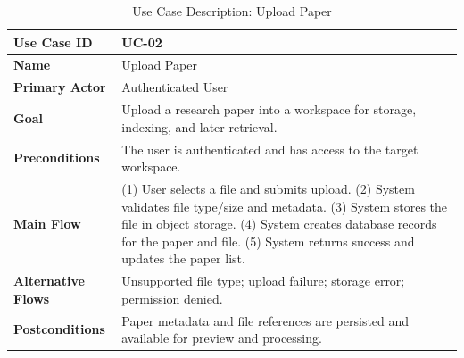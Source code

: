 \begin{table}[H]
    \centering
    \small
    \begin{tabularx}{\textwidth}{|l|X|}
        \hline
        \textbf{Use Case ID}       & UC-02                                                                                                                                                                                                                                                          \\
        \hline
        \textbf{Name}              & Upload Paper                                                                                                                                                                                                                                                   \\
        \hline
        \textbf{Primary Actor}     & Authenticated User                                                                                                                                                                                                                                             \\
        \hline
        \textbf{Goal}              & Upload a research paper into a workspace for storage, indexing, and later retrieval.                                                                                                                                                                           \\
        \hline
        \textbf{Preconditions}     & The user is authenticated and has access to the target workspace.                                                                                                                                                                                              \\
        \hline
        \textbf{Main Flow}         & (1) User selects a file and submits upload. (2) System validates file type/size and metadata. (3) System stores the file in object storage. (4) System creates database records for the paper and file. (5) System returns success and updates the paper list. \\
        \hline
        \textbf{Alternative Flows} & Unsupported file type; upload failure; storage error; permission denied.                                                                                                                                                                                       \\
        \hline
        \textbf{Postconditions}    & Paper metadata and file references are persisted and available for preview and processing.                                                                                                                                                                     \\
        \hline
    \end{tabularx}
    \caption{Use Case Description: Upload Paper}
    \label{tab:srs-uc-02}
\end{table}

